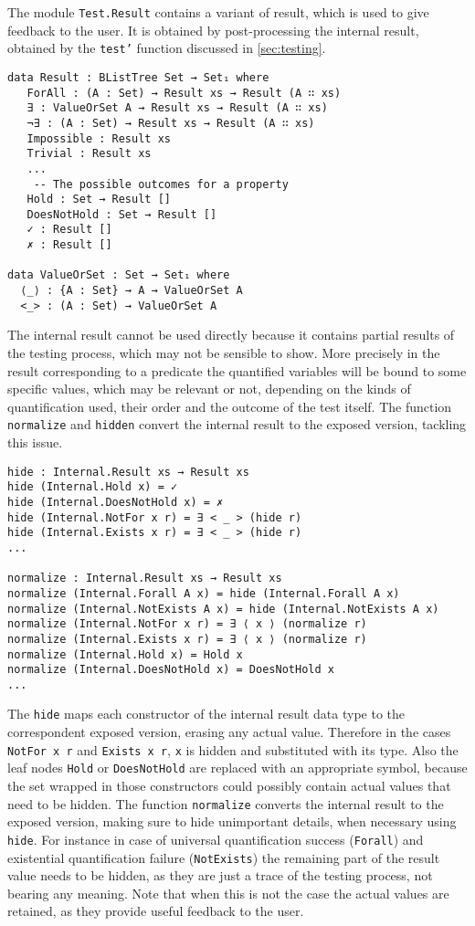 \documentclass[10pt,a4paper]{article}
\begin{document}
The module \texttt{Test.Result} contains a variant of result, which is used to give feedback to the user. It is obtained by post-processing the internal result, obtained by the \texttt{test'} function discussed in \ref{sec:testing}.

\begin{verbatim}
data Result : BListTree Set → Set₁ where
   ForAll : (A : Set) → Result xs → Result (A ∷ xs)
   ∃ : ValueOrSet A → Result xs → Result (A ∷ xs)
   ¬∃ : (A : Set) → Result xs → Result (A ∷ xs)
   Impossible : Result xs
   Trivial : Result xs
   ...
    -- The possible outcomes for a property
   Hold : Set → Result []
   DoesNotHold : Set → Result []
   ✓ : Result []
   ✗ : Result []
   
data ValueOrSet : Set → Set₁ where
  ⟨_⟩ : {A : Set} → A → ValueOrSet A
  <_> : (A : Set) → ValueOrSet A

\end{verbatim}

The internal result cannot be used directly because it contains partial results of the testing process, which may not be sensible to show.
More precisely in the result corresponding to a predicate the quantified variables will be bound to some specific values, which may be relevant or not, depending on the kinds of quantification used, their order and the outcome of the test itself.
The function \texttt{normalize} and \texttt{hidden} convert the internal result to the exposed version, tackling this issue.


\begin{verbatim}
hide : Internal.Result xs → Result xs
hide (Internal.Hold x) = ✓
hide (Internal.DoesNotHold x) = ✗
hide (Internal.NotFor x r) = ∃ < _ > (hide r)
hide (Internal.Exists x r) = ∃ < _ > (hide r)
...

normalize : Internal.Result xs → Result xs
normalize (Internal.Forall A x) = hide (Internal.Forall A x)
normalize (Internal.NotExists A x) = hide (Internal.NotExists A x)
normalize (Internal.NotFor x r) = ∃ ⟨ x ⟩ (normalize r)
normalize (Internal.Exists x r) = ∃ ⟨ x ⟩ (normalize r)
normalize (Internal.Hold x) = Hold x
normalize (Internal.DoesNotHold x) = DoesNotHold x
...
\end{verbatim}
The \texttt{hide} maps each constructor of the internal result data type to the correspondent exposed version, erasing any actual value.
Therefore in the cases \texttt{NotFor x r} and \texttt{Exists x r}, \texttt{x} is hidden and substituted with its type. 
Also the leaf nodes \texttt{Hold} or \texttt{DoesNotHold} are replaced with an appropriate symbol, because the set wrapped in those constructors could possibly contain actual values that need to be hidden.
The function \texttt{normalize} converts the internal result to the exposed version, making sure to hide unimportant details, when necessary using \texttt{hide}. For instance in case of universal quantification success (\texttt{Forall}) and existential quantification failure (\texttt{NotExists}) the remaining part of the result value needs to be hidden, as they are just a trace of the testing process, not bearing any meaning.
Note that when this is not the case the actual values are retained, as they provide useful feedback to the user.
\end{document}

